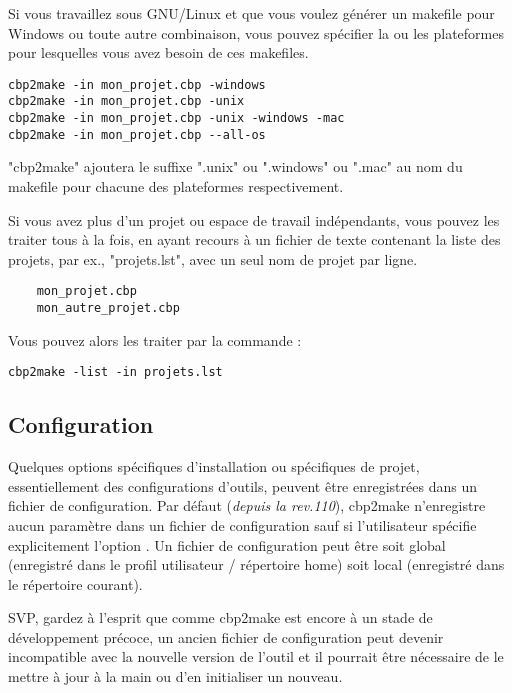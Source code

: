 Si vous travaillez sous GNU/Linux et que vous voulez générer un makefile pour Windows ou toute autre combinaison, vous pouvez spécifier la ou les plateformes pour lesquelles vous avez besoin de ces makefiles.

\begin{lstlisting}
cbp2make -in mon_projet.cbp -windows
cbp2make -in mon_projet.cbp -unix
cbp2make -in mon_projet.cbp -unix -windows -mac
cbp2make -in mon_projet.cbp --all-os
\end{lstlisting}
"cbp2make" ajoutera le suffixe ".unix" ou ".windows" ou ".mac" au nom du makefile pour chacune des plateformes respectivement.

Si vous avez plus d'un projet ou espace de travail indépendants, vous pouvez les traiter tous à la fois, en ayant recours à un fichier de texte contenant la liste des projets, par ex., "projets.lst", avec un seul nom de projet par ligne.

\begin{lstlisting}
    mon_projet.cbp
    mon_autre_projet.cbp 
\end{lstlisting}

Vous pouvez alors les traiter par la commande :
\begin{lstlisting}
cbp2make -list -in projets.lst
\end{lstlisting}

\subsection{Configuration}

Quelques options spécifiques d'installation ou spécifiques de projet, essentiellement des configurations d'outils, peuvent être enregistrées dans un fichier de configuration. Par défaut (\textit{depuis la rev.110}), cbp2make n'enregistre aucun paramètre dans un fichier de configuration sauf si l'utilisateur spécifie explicitement l'option . Un fichier de configuration peut être soit global (enregistré dans le profil utilisateur / répertoire home) soit local (enregistré dans le répertoire courant).

SVP, gardez à l'esprit que comme cbp2make est encore à un stade de développement précoce, un ancien fichier de configuration peut devenir incompatible avec la nouvelle version de l'outil et il pourrait être nécessaire de le mettre à jour à la main ou d'en initialiser un nouveau.

